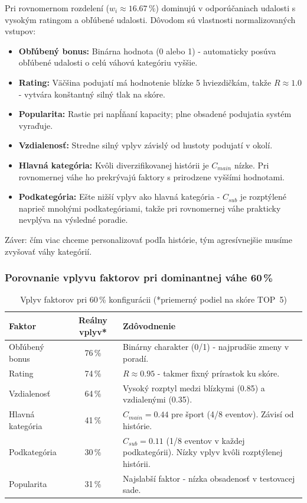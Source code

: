 \documentclass[12pt,a4paper]{article}
\begin{document}
Pri rovnomernom rozdelení ($w_i \approx 16.67\,\%$) dominujú v odporúčaniach
udalosti s vysokým ratingom a obľúbené udalosti. Dôvodom sú vlastnosti
normalizovaných vstupov:

\begin{itemize}
    \item \textbf{Obľúbený bonus:} Binárna hodnota (0 alebo 1) - automaticky
    posúva obľúbené udalosti o celú váhovú kategóriu vyššie.
    \item \textbf{Rating:} Väčšina podujatí má hodnotenie blízke 5 hviezdičkám,
    takže $R \approx 1.0$ - vytvára konštantný silný tlak na skóre.
    \item \textbf{Popularita:} Rastie pri napĺňaní kapacity; plne obsadené
    podujatia systém vyraďuje.
    \item \textbf{Vzdialenosť:} Stredne silný vplyv závislý od hustoty podujatí
    v okolí.
    \item \textbf{Hlavná kategória:} Kvôli diverzifikovanej histórii je $C_{main}$
    nízke. Pri rovnomernej váhe ho prekrývajú faktory s prirodzene vyššími hodnotami.
    \item \textbf{Podkategória:} Ešte nižší vplyv ako hlavná kategória -
    $C_{sub}$ je rozptýlené naprieč mnohými podkategóriami, takže pri rovnomernej
    váhe prakticky nevplýva na výsledné poradie.
\end{itemize}

Záver: čím viac chceme personalizovať podľa histórie, tým agresívnejšie musíme
zvyšovať váhy kategórií.

\subsubsection{Porovnanie vplyvu faktorov pri dominantnej váhe 60\,\%}

\begin{table}[H]
\centering
\small
\begin{tabular}{|l|c|p{8cm}|}
\hline
\textbf{Faktor} & \textbf{Reálny vplyv*} & \textbf{Zdôvodnenie} \\
\hline
Obľúbený bonus   & 76\,\% & Binárny charakter (0/1) - najprudšie zmeny v poradí. \\
\hline
Rating           & 74\,\% & $R \approx 0.95$ - takmer fixný prírastok ku skóre. \\
\hline
Vzdialenosť      & 64\,\% & Vysoký rozptyl medzi blízkymi (0.85) a vzdialenými (0.35). \\
\hline
Hlavná kategória & 41\,\% & $C_{main} = 0.44$ pre šport (4/8 eventov). Závisí od histórie. \\
\hline
Podkategória     & 30\,\% & $C_{sub} = 0.11$ (1/8 eventov v každej podkategórii). Nízky
vplyv kvôli rozptýlenej histórii. \\
\hline
Popularita       & 31\,\% & Najslabší faktor - nízka obsadenosť v testovacej sade. \\
\hline
\end{tabular}
\caption{Vplyv faktorov pri 60\,\% konfigurácii (*priemerný podiel na skóre TOP~5)}
\label{tab:vplyv_faktorov}
\end{table}
\end{document}
